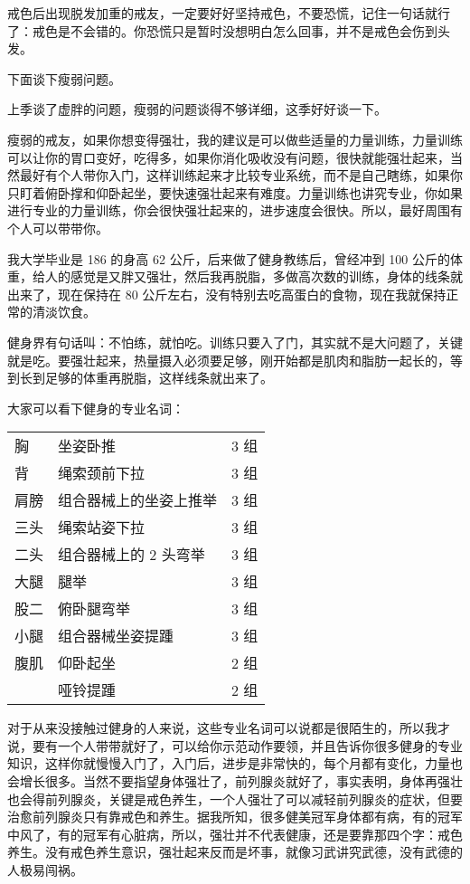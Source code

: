 \documentclass[fontset=founder]{ctexart}
\begin{document}
戒色后出现脱发加重的戒友，一定要好好坚持戒色，不要恐慌，记住一句话就行了：戒色是不会错的。你恐慌只是暂时没想明白怎么回事，并不是戒色会伤到头发。

下面谈下瘦弱问题。

上季谈了虚胖的问题，瘦弱的问题谈得不够详细，这季好好谈一下。

瘦弱的戒友，如果你想变得强壮，我的建议是可以做些适量的力量训练，力量训练可以让你的胃口变好，吃得多，如果你消化吸收没有问题，很快就能强壮起来，当然最好有个人带你入门，这样训练起来才比较专业系统，而不是自己瞎练，如果你只盯着俯卧撑和仰卧起坐，要快速强壮起来有难度。力量训练也讲究专业，你如果进行专业的力量训练，你会很快强壮起来的，进步速度会很快。所以，最好周围有个人可以带带你。

我大学毕业是 186 的身高 62 公斤，后来做了健身教练后，曾经冲到 100 公斤的体重，给人的感觉是又胖又强壮，然后我再脱脂，多做高次数的训练，身体的线条就出来了，现在保持在 80 公斤左右，没有特别去吃高蛋白的食物，现在我就保持正常的清淡饮食。

健身界有句话叫：不怕练，就怕吃。训练只要入了门，其实就不是大问题了，关键就是吃。要强壮起来，热量摄入必须要足够，刚开始都是肌肉和脂肪一起长的，等到长到足够的体重再脱脂，这样线条就出来了。

大家可以看下健身的专业名词：

\begin{table}[ht]
    \centering
    \begin{tabular}{l l l}
        胸  & 坐姿卧推         & 3 组 \\
        背  & 绳索颈前下拉       & 3 组 \\
        肩膀 & 组合器械上的坐姿上推举  & 3 组 \\
        三头 & 绳索站姿下拉       & 3 组 \\
        二头 & 组合器械上的 2 头弯举 & 3 组 \\
        大腿 & 腿举           & 3 组 \\
        股二 & 俯卧腿弯举        & 3 组 \\
        小腿 & 组合器械坐姿提踵     & 3 组 \\
        腹肌 & 仰卧起坐         & 2 组 \\
           & 哑铃提踵         & 2 组
    \end{tabular}
\end{table}

对于从来没接触过健身的人来说，这些专业名词可以说都是很陌生的，所以我才说，要有一个人带带就好了，可以给你示范动作要领，并且告诉你很多健身的专业知识，这样你就慢慢入门了，入门后，进步是非常快的，每个月都有变化，力量也会增长很多。当然不要指望身体强壮了，前列腺炎就好了，事实表明，身体再强壮也会得前列腺炎，关键是戒色养生，一个人强壮了可以减轻前列腺炎的症状，但要治愈前列腺炎只有靠戒色和养生。据我所知，很多健美冠军身体都有病，有的冠军中风了，有的冠军有心脏病，所以，强壮并不代表健康，还是要靠那四个字：戒色养生。没有戒色养生意识，强壮起来反而是坏事，就像习武讲究武德，没有武德的人极易闯祸。
\end{document}
